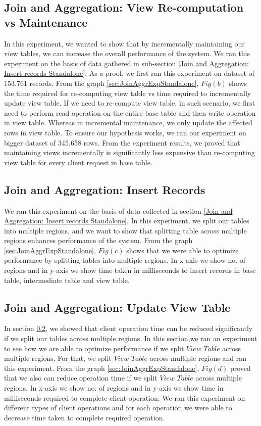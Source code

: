 \documentclass[11pt,a4paper,bibtotoc,idxtotoc,headsepline,footsepline,footexclude,BCOR12mm,DIV13]{scrbook}
\begin{document}
\subsection{Join and Aggregation: View Re-computation vs Maintenance}
\label{Join and Aggregation: View Re-computation vs Maintenance Standalone}
In this experiment, we wanted to show that by incrementally maintaining our view tables, we can increase the overall performance of the system. We ran this experiment on the basis of data gathered in sub-section \ref{Join and Aggregation: Insert records Standalone}. As a proof, we first ran this experiment on dataset of 153.761 records. From the graph \ref{sec:JoinAggrExpStandalone}, $Fig(b)$ shows the time required for re-computing view table vs time required to incrementally update view table. If we need to re-compute view table, in such scenario, we first need to perform read operation on the entire base table and then write operation in view table. Whereas in incremental maintenance, we only update the affected rows in view table. To ensure our hypothesis works, we ran our experiment on bigger dataset of 345.658 rows. From the experiment results, we proved that maintaining views incrementally is significantly less expensive than re-computing view table for every client request in base table.

\subsection{Join and Aggregation: Insert Records}
\label{Join and Aggregation: Insert Records Standalone}
We ran this experiment on the basis of data collected in section \ref{Join and Aggregation: Insert records Standalone}. In this experiment, we split our tables into multiple regions, and we want to show that splitting table across multiple regions enhances performance of the system. From the graph \ref{sec:JoinAggrExpStandalone}, $Fig(c)$ shows that we were able to optimize performance by splitting tables into multiple regions. In x-axis we show no. of regions and in y-axis we show time taken in milliseconds to insert records in base table, intermediate table and view table.

\subsection{Join and Aggregation: Update View Table} 
\label{Join and Aggr: Update View Table Standalone}
In section \ref{Join and Aggregation: Insert Records Standalone}, we showed that client operation time can be reduced significantly if we split our tables across multiple regions. In this section,we ran an experiment to see how we are able to optimize performance if we split $View$ $Table$ across multiple regions. For that, we split $View$ $Table$ across multiple regions and ran this experiment. From the graph \ref{sec:JoinAggrExpStandalone}, $Fig(d)$ proved that we also can reduce operation time if we split $View$ $Table$ across multiple regions. In x-axis we show no. of regions and in y-axis we show time in milliseconds required to complete client operation. We ran this experiment on different types of client operations and for each operation we were able to decrease time taken to complete required operation. 
\end{document}
